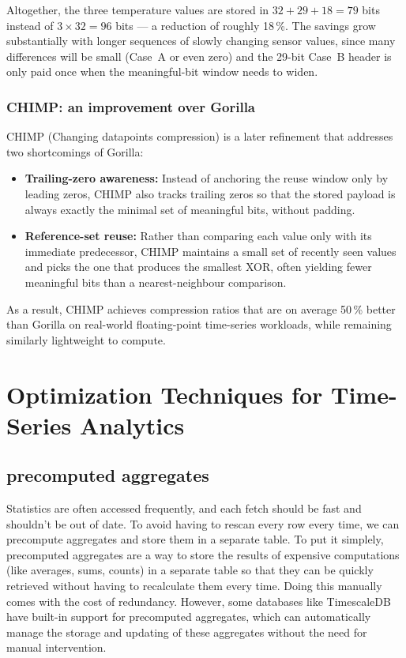 Altogether, the three temperature values are stored in $32 + 29 + 18 = 79$ bits
instead of $3 \times 32 = 96$ bits --- a reduction of roughly 18\,\%. The
savings grow substantially with longer sequences of slowly changing sensor
values, since many differences will be small (Case~A or even zero) and the
29-bit Case~B header is only paid once when the meaningful-bit window needs to
widen.

\subsubsection{CHIMP\@: an improvement over Gorilla}

CHIMP (Changing datapoints compression) is a later refinement that addresses
two shortcomings of Gorilla:

\begin{itemize}
  \item \textbf{Trailing-zero awareness:} Instead of anchoring the reuse window only by leading zeros, CHIMP also tracks trailing zeros so that the stored payload is always exactly the minimal set of meaningful bits, without padding.
  \item \textbf{Reference-set reuse:} Rather than comparing each value only with its immediate predecessor, CHIMP maintains a small set of recently seen values and picks the one that produces the smallest XOR, often yielding fewer meaningful bits than a nearest-neighbour comparison.
\end{itemize}

As a result, CHIMP achieves compression ratios that are on average 50\,\%
better than Gorilla on real-world floating-point time-series workloads, while
remaining similarly lightweight to compute.~\cite{Liakos:01}

\section{Optimization Techniques for Time-Series Analytics}

\subsection{precomputed aggregates}

Statistics are often accessed frequently, and each fetch should be fast and
shouldn't be out of date. To avoid having to rescan every row every time, we
can precompute aggregates and store them in a separate table. To put it
simplely, precomputed aggregates are a way to store the results of expensive
computations (like averages, sums, counts) in a separate table so that they can
be quickly retrieved without having to recalculate them every time. Doing this
manually comes with the cost of redundancy. However, some databases like
TimescaleDB have built-in support for precomputed aggregates, which can
automatically manage the storage and updating of these aggregates without the
need for manual intervention.


